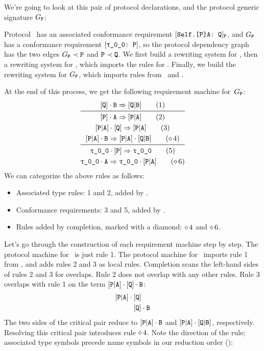 \documentclass[../generics]{subfiles}
\begin{document}
\begin{example}\label{assoc type completion example}
We're going to look at this pair of protocol declarations, and the protocol generic signature $G_{\texttt{P}}$:

Protocol \tP\ has an associated conformance requirement $[\texttt{Self.[P]A:~Q}]_{\texttt{P}}$, and $G_{\texttt{P}}$ has a conformance requirement $\ConfReq{\rT}{P}$, so the protocol dependency graph has the two edges $G_{\texttt{P}}\prec\texttt{P}$ and $\texttt{P}\prec\texttt{Q}$. We first build a rewriting system for \tQ, then a rewriting system for \tP, which imports the rules for \tQ. Finally, we build the rewriting system for $G_{\texttt{P}}$, which imports rules from \tP\ and \tQ.

At the end of this process, we get the following requirement machine for~$G_{\texttt{P}}$:
\begin{gather*}
\AssocIntro{Q}{B}\tag{1}\\
\midrule
\AssocIntro{P}{A}\tag{2}\\
\ProtoConf{\aPA}{Q}\tag{3}\\
\aPA\cdot\nB\Red\aPA\cdot\aQB\tag{$\CRule{4}$}\\
\midrule
\ProtoConf{\rT}{P}\tag{5}\\
\rT\cdot\nA\Red\rT\cdot\aPA\tag{$\CRule{6}$}
\end{gather*}
We can categorize the above rules as follows:
\begin{itemize}
\item Associated type rules: 1 and 2, added by .
\item Conformance requirements: 3 and 5, added by .
\item Rules added by completion, marked with a diamond: $\diamond\, 4$ and $\diamond\, 6$.
\end{itemize}
Let's go through the construction of each requirement machine step by step. The protocol machine for \tQ\ is just rule 1. The protocol machine for \tP\ imports rule 1 from \tQ, and adds rules 2 and 3 as local rules. Completion scans the left-hand sides of rules 2 and 3 for overlaps. Rule 2 does not overlap with any other rules. Rule 3 overlaps with rule 1 on the term $[\texttt{P}|\texttt{A}]\cdot[\texttt{Q}]\cdot\texttt{B}$:
\begin{align*}
[\texttt{P}|\texttt{A}]\cdot{}&[\texttt{Q}]\\
&[\texttt{Q}]\cdot\texttt{B}
\end{align*}
The two sides of the critical pair reduce to $[\texttt{P}|\texttt{A}]\cdot\texttt{B}$ and $[\texttt{P}|\texttt{A}]\cdot[\texttt{Q}|\texttt{B}]$, respectively. Resolving this critical pair introduces rule $\diamond\, 4$. Note the direction of the rule; associated type symbols precede name symbols in our reduction order ():

\end{example}
\end{document}
